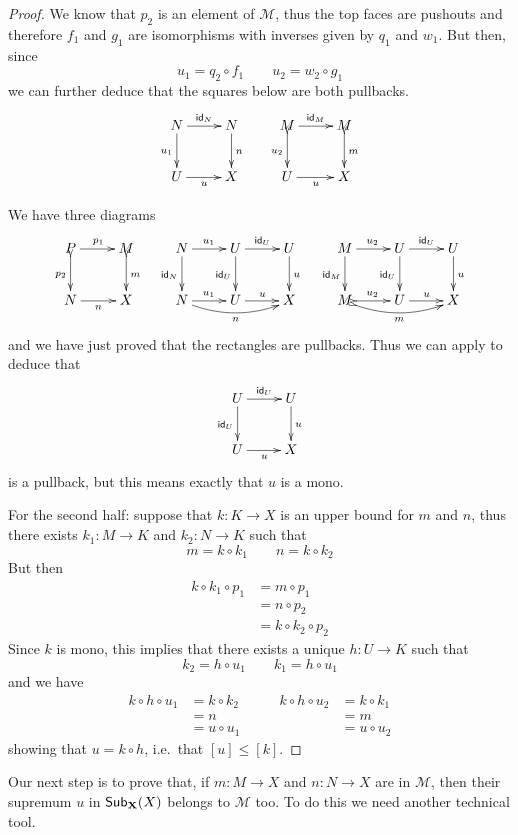 \documentclass[a4paper]{article}
\newcommand{\msub}[2]{\mathsf{Sub}_{\textbf {\textup{#1}}}(#2)}
\newcommand{\id}[1]{\mathsf{id}_{#1}}
\theoremstyle{definition}
\begin{document}
\begin{proof}
	We know that $p_2$ is an element of $\mathcal{M}$, thus  the top faces are pushouts and therefore $f_1$ and $g_1$ are isomorphisms with inverses given by $q_1$ and $w_1$.  But then, since
	\[u_1=q_2\circ f_1 \qquad u_2=w_2\circ g_1\]
	we can further deduce that the squares below  are both pullbacks.
	\[\xymatrix{N \ar[r]^{\id{N}} \ar[d]_{u_1} & N\ar[d]^{n} & M \ar[r]^{\id{M}} \ar@{>->}[d]_{u_2}& M\ar@{>->}[d]^{m}\\
		U \ar[r]_{u}& X & U \ar[r]_{u}& X}\]
	
	We have three diagrams 
	\[\xymatrix{P\ar@{>->}[d]_{p_2} \ar[r]^{p_1} & M \ar@{>->}[d]^{m}  & N \ar[d]_{\id{N}} \ar[r]^{u_1}& U\ar[d]_{\id{U}} \ar[r]^{\id{U}}  & U \ar[d]^{u} &  M \ar[d]_{\id{M}} \ar[r]^{u_2}& U \ar[r]^{\id{U}} \ar[d]_{\id{U}}  & U \ar[d]^{u}\\N \ar[r]_{n} & X & N \ar@/_.3cm/[rr]_{n}\ar[r]^{u_1} & U  \ar[r]^u  &X & M\ar@{>->}@/_.3cm/[rr]_{m}\ar@{>->}[r]^{u_2} & U  \ar[r]^u  &X }\]
	and we have just proved that the rectangles are pullbacks. Thus we can apply  to deduce that 
	\[\xymatrix{ U \ar[r]^{\id{U}} \ar[d]_{\id{U}}  & U \ar[d]^{u}\\ U  \ar[r]_u  &X }\]
	is a pullback, but this means exactly that $u$ is a mono.
	
	For the second half: suppose that $k\colon K\to X$ is an upper bound for $m$ and $n$, thus there exists $k_1\colon M\to K$ and $k_2\colon N\to K$ such that
	\[m=k\circ k_1 \qquad n=k\circ k_2\] 
	But then
	\begin{align*}
		k\circ k_1 \circ p_1 &= m\circ p_1\\&= n\circ p_2\\&= k\circ k_2\circ p_2
	\end{align*}
	Since $k$ is mono, this implies that there exists a unique $h\colon U\to K$ such that 
	\[k_2=h\circ u_1 \qquad k_1=h\circ u_1\]
	and we have
	\[\begin{split}
		k\circ h \circ u_1&=k\circ k_2\\&=n \\&=u \circ u_1 
	\end{split}\qquad 
	\begin{split}
		k\circ h \circ u_2&=k\circ k_1\\&=m \\&=u \circ u_2 
	\end{split} \]
	showing that $u=k\circ h$, i.e.~that $[u]\leq [k]$.
\end{proof}
 
Our next step is to prove that, if $m\colon M\to X$ and $n\colon N\to X$ are in $\mathcal{M}$, then their supremum $u$ in $\msub{X}{X}$ belongs to $\mathcal{M}$ too. To do this we need another technical tool.
 
\end{document}
